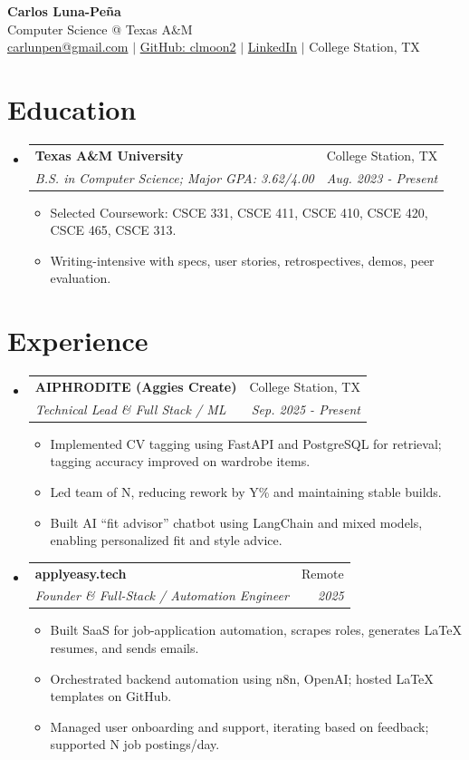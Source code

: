 \documentclass[letterpaper,11pt]{article}
\makeatletter
\newcommand{\resumeItem}[1]{
  \item\small{{#1 \vspace{-2pt}}}
}
\newcommand{\resumeSubheading}[4]{
  \vspace{-2pt}\item
  \begin{tabular*}{0.97\textwidth}[t]{l@{\extracolsep{\fill}}r}
    \textbf{#1} & #2 \\
    \textit{\small#3} & \textit{\small #4} \\
  \end{tabular*}\vspace{-7pt}
}
\newcommand{\resumeSubHeadingListStart}{\begin{itemize}[leftmargin=0.15in, label={}]}
\newcommand{\resumeSubHeadingListEnd}{\end{itemize}}
\newcommand{\resumeItemListStart}{\begin{itemize}}
\newcommand{\resumeItemListEnd}{\end{itemize}\vspace{-5pt}}
\makeatother
\begin{document}
\begin{center}
  \textbf{\huge Carlos Luna-Peña} \\
  \small Computer Science @ Texas A\&M \\
  \href{mailto:carlunpen@gmail.com}{carlunpen@gmail.com} $|$ \href{https://github.com/clmoon2}{GitHub: clmoon2} $|$ \href{https://linkedin.com/in/carlos-luna}{LinkedIn} $|$ College Station, TX
\end{center}

\section{Education}
\resumeSubHeadingListStart
\resumeSubheading
{Texas A\&M University}{College Station, TX}
{B.S. in Computer Science; Major GPA: 3.62/4.00}{Aug. 2023 - Present}
\resumeItemListStart
\resumeItem{Selected Coursework: CSCE 331, CSCE 411, CSCE 410, CSCE 420, CSCE 465, CSCE 313.}
\resumeItem{Writing-intensive with specs, user stories, retrospectives, demos, peer evaluation.}
\resumeItemListEnd
\resumeSubHeadingListEnd

\section{Experience}
\resumeSubHeadingListStart
\resumeSubheading
{AIPHRODITE (Aggies Create)}{College Station, TX}
{Technical Lead \& Full Stack / ML}{Sep. 2025 - Present}
\resumeItemListStart
\resumeItem{Implemented CV tagging using FastAPI and PostgreSQL for retrieval; tagging accuracy improved on wardrobe items.}
\resumeItem{Led team of {N}, reducing rework by {Y}\% and maintaining stable builds.}
\resumeItem{Built AI “fit advisor” chatbot using LangChain and mixed models, enabling personalized fit and style advice.}
\resumeItemListEnd
\resumeSubheading
{applyeasy.tech}{Remote}
{Founder \& Full-Stack / Automation Engineer}{2025}
\resumeItemListStart
\resumeItem{Built SaaS for job-application automation, scrapes roles, generates LaTeX resumes, and sends emails.}
\resumeItem{Orchestrated backend automation using n8n, OpenAI; hosted LaTeX templates on GitHub.}
\resumeItem{Managed user onboarding and support, iterating based on feedback; supported {N} job postings/day.}
\resumeItemListEnd
\resumeSubHeadingListEnd
\end{document}
